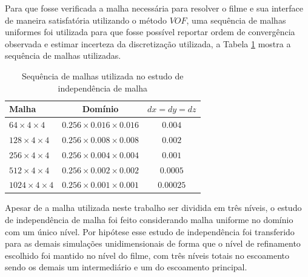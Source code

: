 Para que fosse verificada a malha necessária para resolver o filme e sua interface de maneira satisfatória utilizando o método $VOF$, uma sequência de malhas uniformes foi utilizada para que fosse possível reportar ordem de convergência observada e estimar incerteza da discretização utilizada, a Tabela \ref{tab:malhas-independência} mostra a sequência de malhas utilizadas.

\begin{table}[htb]
    \centering
    \caption{Sequência de malhas utilizada no estudo de independência de malha}
    \label{tab:malhas-independência}
    \begin{tabular}{@{}l cc@{}}
        \toprule
        Malha                       & Domínio                          & $dx = dy = dz$                          \\
        \midrule
        $64     \times 4 \times 4$      & $0{.}256 \times 0{.}016 \times 0{.}016$   & $0{.}004$                      \\
        $128    \times 4 \times 4$      & $0{.}256 \times 0{.}008 \times 0{.}008$   & $0{.}002$                      \\
        $256    \times 4 \times 4$      & $0{.}256 \times 0{.}004 \times 0{.}004$   & $0{.}001$                      \\
        $512    \times 4 \times 4$      & $0{.}256 \times 0{.}002 \times 0{.}002$   & $0{.}0005$                     \\
        $1024   \times 4 \times 4$      & $0{.}256 \times 0{.}001 \times 0{.}001$   & $0{.}00025$                    \\
        \bottomrule
    \end{tabular}
\end{table}

Apesar de a malha utilizada neste trabalho ser dividida em três níveis, o estudo de independência de malha foi feito considerando malha uniforme no domínio com um único nível. Por hipótese esse estudo de independência foi transferido para as demais simulações unidimensionais de forma que o nível de refinamento escolhido foi mantido no nível do filme, com três níveis totais no escoamento sendo os demais um intermediário e um do escoamento principal.
